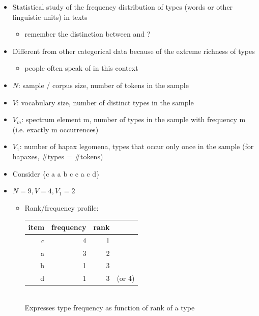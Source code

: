\documentclass[a4paper,landscape,headrule,footrule,xetex]{foils}
\begin{document}
\begin{itemize}
\item Statistical study of the frequency distribution of types
(words or other linguistic units) in texts
\begin{itemize}
\item remember the distinction between  and ?
\end{itemize}

\item Different from other categorical data because of
the extreme richness of types
\begin{itemize}
\item people often speak of  in this context
\end{itemize}
\end{itemize}
\begin{itemize}
\item $N$: sample / corpus size, number of tokens in the sample
\item $V$: vocabulary size, number of distinct types in the sample
\item $V_m$: spectrum element m, number of types in the sample
with frequency m (i.e. exactly m occurrences)
\item $V_1$: number of hapax legomena, types that occur only
once in the sample (for hapaxes, \#types = \#tokens)
\item Consider \{c a a b c c a c d\}
\item $N = 9, V = 4, V_1 = 2$
  \begin{itemize}
  \item Rank/frequency profile:
    \begin{tabular}[t]{rrrl}
      item & frequency &  rank \\ \hline
      c & 4 & 1\\
      a & 3 & 2\\
      b & 1 & 3 \\
      d & 1 & 3 & (or 4) 
    \end{tabular}
\\ Expresses type frequency as function of rank of a type
\end{itemize}
\end{itemize}

\end{document}
